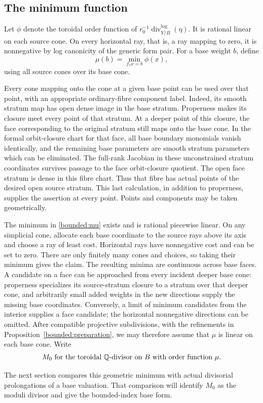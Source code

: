 \subsection{The minimum function}

Let \(\phi\) denote the toroidal order function of
\(r_0^{-1}\operatorname{div}^{\log}_{Y/B}(\eta)\).  It is rational linear
on each source cone.  On every horizontal ray, that is, a ray mapping
to zero, it is nonnegative by log canonicity of the generic form pair.
For a base weight \(b\), define
\begin{equation}
 \mu(b)=\min_{f_*x=b}\phi(x),
 \label{bounded:mu}
\end{equation}
using all source cones over its base cone.

Every cone mapping onto the cone at a given base point can be used
over that point, with an appropriate ordinary-fibre component label.
Indeed, its smooth stratum map has open dense image in the base
stratum.  Properness makes its closure meet every point of that
stratum.  At a deeper point of this closure, the face corresponding
to the original stratum still maps onto the base cone.  In the formal
orbit-closure chart for that face, all base boundary monomials vanish
identically, and the remaining base parameters are smooth stratum
parameters which can be eliminated. The full-rank Jacobian in these
unconstrained stratum coordinates survives passage to the face
orbit-closure quotient. The open face stratum is dense
in this fibre chart.  Thus that fibre has actual points of the desired
open source stratum.  This last calculation, in addition to
properness, supplies the assertion at every point.  Points and
components may be taken geometrically.

The minimum in \eqref{bounded:mu} exists and is rational piecewise
linear.  On any simplicial cone, allocate each base coordinate to the
source rays above its axis and choose a ray of least cost.  Horizontal
rays have nonnegative cost and can be set to zero.  There are only
finitely many cones and choices, so taking their minimum gives the
claim.  The resulting minima are continuous across base faces.  A
candidate on a face can be approached from every incident deeper base
cone: properness specializes its source-stratum closure to a stratum
over that deeper cone, and arbitrarily small added weights in the
new directions supply the missing base coordinates.  Conversely, a
limit of minimum candidates from the interior supplies a face
candidate; the horizontal nonnegative directions can be omitted.
After compatible projective subdivisions, with the refinements in
Proposition~\ref{bounded:preparation}, we may therefore assume that
\(\mu\) is linear on each base cone.  Write
\begin{equation}
 M_0\text{ for the toroidal \(\mathbb Q\)-divisor on \(B\) with order function
 }\mu.
 \label{bounded:moduli}
\end{equation}

The next section compares this geometric minimum with actual
divisorial prolongations of a base valuation.  That comparison will
identify \(M_0\) as the moduli divisor and give the bounded-index
base form.
